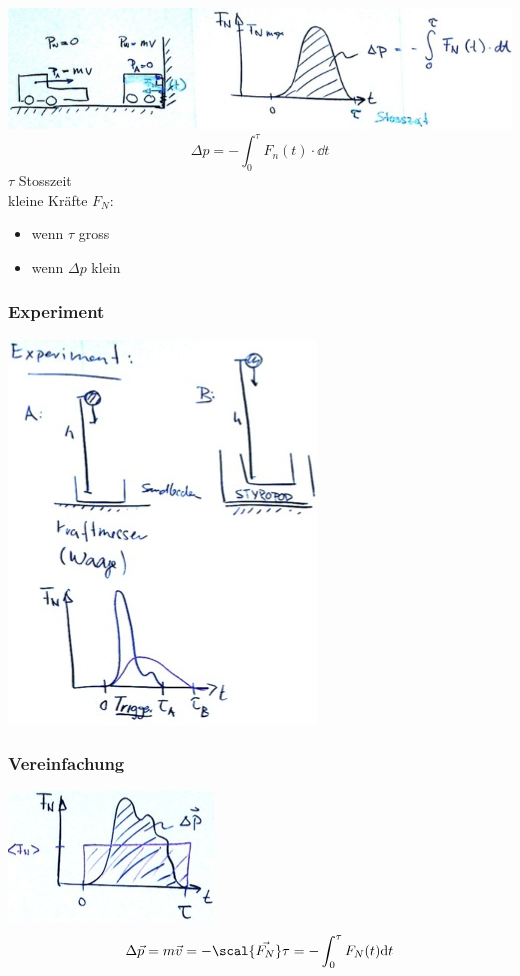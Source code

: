 \includegraphics{Bild33}
\[ \Delta p = -\int_0^\tau F_n(t) \cdot \dd t \]
$\tau$ Stosszeit \\
kleine Kräfte $F_N$:
\begin{itemize}
	\item wenn $\tau$ gross
	\item wenn $\Delta p$ klein
\end{itemize}

\subsubsection{Experiment}
\includegraphics{Bild34}

\subsubsection{Vereinfachung}
\includegraphics{Bild35}
\[ \Delta \vec{p} = m \vec{v} = - \scal{\vec{F_N}} \tau = - \int_0^\tau F_N(t) \dd t \]

